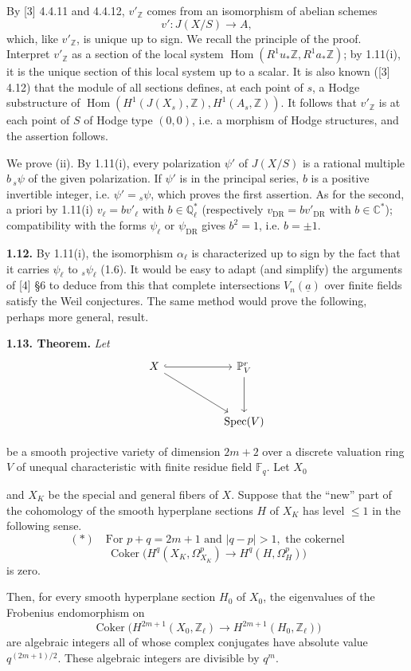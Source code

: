 \documentclass[10pt]{article}
\newcommand{\C}{\mathbb C}
\newcommand{\F}{\mathbb F}
\newcommand{\Pj}{\mathbb P}
\newcommand{\Q}{\mathbb Q}
\newcommand{\Z}{\mathbb Z}
\newcommand{\DR}{\mathrm{DR}}
\newcommand{\Spec}{\operatorname{Spec}}
\newcommand{\Hom}{\operatorname{Hom}}
\newcommand{\Coker}{\operatorname{Coker}}
\newcommand{\sourcebreak}{\clearpage}
\begin{document}
By [3] 4.4.11 and 4.4.12, \(v'_\Z\) comes from an isomorphism of abelian schemes
\[
v':J(X/S)\longrightarrow A,
\]
which, like \(v'_\Z\), is unique up to sign. We recall the principle of the proof. Interpret \(v'_\Z\) as a section of the local system \(\Hom(R^1u_*\Z,R^1a_*\Z)\); by 1.11(i), it is the unique section of this local system up to a scalar. It is also known ([3] 4.12) that the module of all sections defines, at each point of \(s\), a Hodge substructure of \(\Hom(H^1(J(X_s),\Z),H^1(A_s,\Z))\). It follows that \(v'_\Z\) is at each point of \(S\) of Hodge type \((0,0)\), i.e. a morphism of Hodge structures, and the assertion follows.

We prove (ii). By 1.11(i), every polarization \(\psi'\) of \(J(X/S)\) is a rational multiple \(b\,{}_s\psi\) of the given polarization. If \(\psi'\) is in the principal series, \(b\) is a positive invertible integer, i.e. \(\psi'={}_s\psi\), which proves the first assertion. As for the second, a priori by 1.11(i) \(v_\ell=bv'_\ell\) with \(b\in\Q_\ell^*\) (respectively \(v_{\DR}=bv'_{\DR}\) with \(b\in\C^*\)); compatibility with the forms \(\psi_\ell\) or \(\psi_{\DR}\) gives \(b^2=1\), i.e. \(b=\pm1\).

\noindent\textbf{1.12.} By 1.11(i), the isomorphism \(\alpha_\ell\) is characterized up to sign by the fact that it carries \(\psi_\ell\) to \({}_s\psi_\ell\) (1.6). It would be easy to adapt (and simplify) the arguments of [4] \S6 to deduce from this that complete intersections \(V_n(\underline a)\) over finite fields satisfy the Weil conjectures. The same method would prove the following, perhaps more general, result.

\noindent\textbf{1.13. Theorem.} \emph{Let}
\[
\begin{tikzcd}[column sep=5em,row sep=3.2em]
X \arrow[r,hook] \arrow[dr] & \Pj_V^r \arrow[d]\\
& \Spec(V)
\end{tikzcd}
\]
\begin{itshape}
be a smooth projective variety of dimension \(2m+2\) over a discrete valuation ring \(V\) of unequal characteristic with finite residue field \(\F_q\). Let \(X_0\)

\sourcebreak
and \(X_K\) be the special and general fibers of \(X\). Suppose that the ``new'' part of the cohomology of the smooth hyperplane sections \(H\) of \(X_K\) has level \(\leq1\) in the following sense.
\[
(*)\quad \text{For }p+q=2m+1\text{ and }|q-p|>1,\text{ the cokernel}
\]
\[
\Coker\bigl(H^q(X_K,\Omega^p_{X_K})\longrightarrow H^q(H,\Omega^p_H)\bigr)
\]
is zero.

Then, for every smooth hyperplane section \(H_0\) of \(X_0\), the eigenvalues of the Frobenius endomorphism on
\[
\Coker\bigl(H^{2m+1}(X_0,\Z_\ell)\longrightarrow H^{2m+1}(H_0,\Z_\ell)\bigr)
\]
are algebraic integers all of whose complex conjugates have absolute value \(q^{(2m+1)/2}\). These algebraic integers are divisible by \(q^m\).
\end{itshape}
\end{document}

